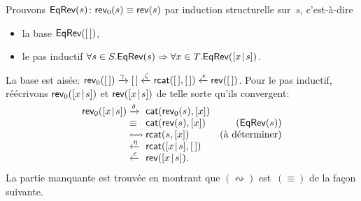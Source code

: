 Prouvons \label{EqRev} \(\textsf{EqRev}({s}) \colon \textsf{rev}_0(s) \equiv
\textsf{rev}(s)\)
par induction
structurelle sur~\(s\), c'est-à-dire
\begin{itemize}

  \item la base \(\textsf{EqRev}({[\,]})\),

  \item le pas inductif \(\forall s \in S.\textsf{EqRev}({s}) \Rightarrow
    \forall x \in T.\textsf{EqRev}({[{x}\!\mid\!{s}]})\).

\end{itemize}
La base est aisée: \(\textsf{rev}_0([\,]) \xrightarrow{\smash{\gamma}} [\,]
\xleftarrow{\smash{\zeta}} \textsf{rcat}([\,],[\,])
\xleftarrow{\smash{\epsilon}}
\textsf{rev}([\,])\). Pour le pas inductif,
réécrivons \(\textsf{rev}_0([{x}\!\mid\!{s}])\) et \(\textsf{rev}([{x}\!\mid\!{s}])\)
de telle sorte qu'ils convergent:
\begin{equation*}
\begin{array}{@{}r@{\;}l@{\;}lr@{}}
  \fun{rev}_0(\cons{x}{s})
& \xrightarrow{\smash{\delta}}
& \fun{cat}(\fun{rev}_0(s),[x])\\
& \equiv
& \fun{cat}(\fun{rev}(s),[x])
& (\pred{EqRev}{s})\\
& \leftrightsquigarrow
& \fun{rcat}(s,[x])
& (\text{à déterminer})\\
& \xleftarrow{\smash{\eta}}
& \fun{rcat}(\cons{x}{s},\el)\\
& \xleftarrow{\smash{\epsilon}}
& \fun{rev}(\cons{x}{s}).
\end{array}
\end{equation*}
La partie manquante est trouvée en montrant que
\((\leftrightsquigarrow)\) est~\((\equiv)\) de la façon
suivante.

